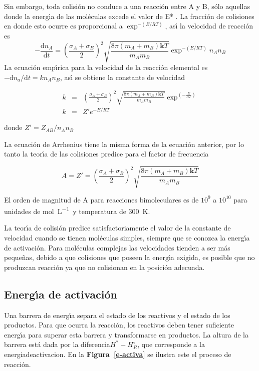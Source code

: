Sin embargo, toda colisi\'on no conduce a una reacci\'on entre A y B, s\'olo aquellas donde la energ\'{\i}a de las mol\'eculas excede el valor de E* . La fracci\'on de colisiones en donde esto ocurre es proporcional a \( \exp^{-(E/RT)} \), as\'{\i}  la velocidad de reacci\'on es
\begin{equation}
 -\frac{\mathrm{d}n_A}{\mathrm{d}t}=\left(\frac{ \sigma_A+ \sigma_B }{ 2 }\right)^2 \sqrt{\frac{8 \pi(m_A+m_B)\textbf{k}T }{m_Am_B}} \exp^{-(E/RT)} n_An_B 
\end{equation}
La ecuaci\'on emp\'{\i}rica para la velocidad de la reacci\'on elemental es \( -\mathrm{d}n_a/\mathrm{d}t=kn_An_B \), as\'{\i} se obtiene la constante de velocidad

\begin{eqnarray}
 k&=&\left(\frac{ \sigma_A+ \sigma_B }{ 2 }\right)^2 \sqrt{\frac{8 \pi(m_A+m_B)\textbf{k}T }{m_Am_B}} \exp^{(-\frac{E}{RT})} \\
 k&=&Z'e^{-E/RT}
\end{eqnarray}

donde \( Z'=Z_{AB}/n_An_B \)

La ecuaci\'on de Arrhenius  tiene la misma forma de la ecuaci\'on anterior, por lo tanto la teor\'{\i}a de las colisiones predice para el factor de frecuencia 

\begin{equation}
A=Z'= \left(\frac{ \sigma_A+ \sigma_B }{ 2 }\right)^2 \sqrt{\frac{8 \pi(m_A+m_B)\textbf{k}T }{m_Am_B}}
\end{equation}

El orden de magnitud de A para reacciones bimoleculares es de $10^9$ a $10^{10}$ para unidades de \si{\mole\per\liter}~y temperatura de \SI{300}{\kelvin}.

La teor\'{\i}a de colisi\'on predice satisfactoriamente el valor de la constante de velocidad cuando se tienen mol\'eculas simples, siempre que se conozca la energ\'{\i}a de activaci\'on. Para mol\'eculas complejas las velocidades tienden a ser m\'as peque\~nas, debido a que  colisiones que poseen la energ\'{\i}a exigida, es posible que no produzcan reacci\'on ya que no colisionan en la posici\'on adecuada.

\subsection{Energ\'{\i}a de activaci\'on}

Una barrera de energ\'{\i}a separa el estado de los reactivos y el estado de los productos. Para que ocurra la reacci\'on, los reactivos deben tener suficiente energ\'{\i}a para superar esta barrera y transformarse en productos. La altura de la barrera est\'a dada por la diferencia$H^* - H^\circ _R$, que corresponde a la \gls{energiadeactivacion}.
  En la \textbf{Figura~\ref{e-activa}} se ilustra este el proceso de reacci\'on. 

